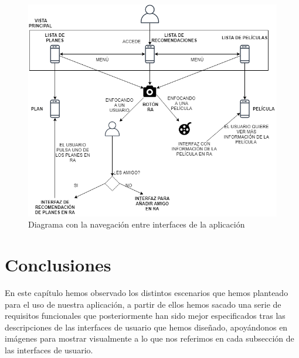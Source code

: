 \begin{figure}[H]
    \centering
    \includegraphics[width=6in]{figures/chapter-3/Navegacion.png}
    \caption{Diagrama con la navegación entre interfaces de la aplicación}
    \label{fig:navegacion}
\end{figure}

\section{Conclusiones}
En este capítulo hemos observado los distintos escenarios que hemos planteado para el uso de nuestra aplicación, a partir de ellos hemos sacado una serie de 
 requisitos funcionales que posteriormente han sido mejor especificados tras las descripciones de las interfaces de usuario que hemos diseñado, apoyándonos en imágenes 
 para mostrar visualmente a lo que nos referimos en cada subsección de las interfaces de usuario.



